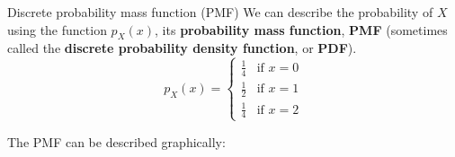 \begin{frame}{Discrete probability mass function (PMF)}
We can describe the probability of $X$ using the function $p_X(x)$, its \textbf{probability mass function}, \textbf{PMF} (sometimes called the \textbf{discrete probability density function}, or \textbf{PDF}).
\begin{equation*}
    p_X(x) = \begin{cases}
    \frac{1}{4} &\text{if } x = 0 \\
    \frac{1}{2} &\text{if }x=1 \\
    \frac{1}{4} &\text{if }x=2
    \end{cases}
\end{equation*}

The PMF can be described graphically: 
\begin{figure}
\end{figure}


\end{frame}


